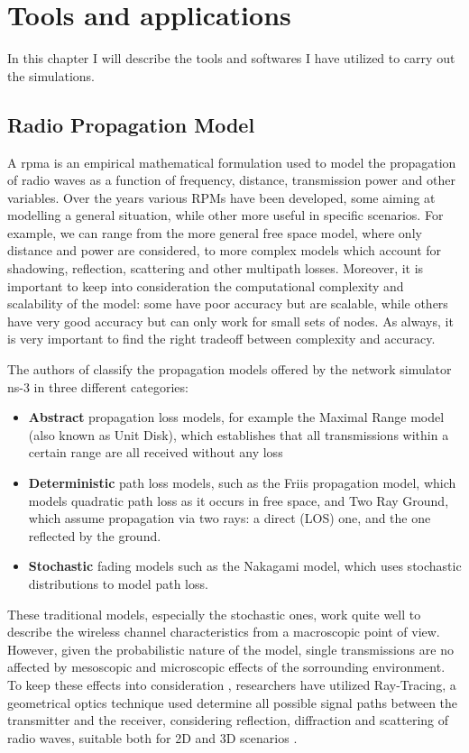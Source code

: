 
\chapter{Tools and applications}
	In this chapter I will describe the tools and softwares I have utilized to carry out the simulations.
	
	\section{Radio Propagation Model}
		A \gls{rpma} is an empirical mathematical formulation used to model the propagation of radio waves as a function of frequency, distance, transmission power and other variables. Over the years various RPMs have been developed, some aiming at modelling a general situation, while other more useful in specific scenarios. For example, we can range from the more general free space model, where only distance and power are considered, to more complex models which account for shadowing, reflection, scattering and other multipath losses. Moreover, it is important to keep into consideration the computational complexity and scalability of the model: some have poor accuracy but are scalable, while others have very good accuracy but can only work for small sets of nodes. As always, it is very important to find the right tradeoff between complexity and accuracy.
		
		
		The authors of \cite{6298165} classify the propagation models offered by the network simulator ns-3 in three different categories:
		\begin{itemize}
			\item \textbf{Abstract} propagation loss models, for example the Maximal Range model (also known as Unit Disk), which establishes that all transmissions within a certain range are all received without any loss
			\item \textbf{Deterministic} path loss models, such as the Friis propagation model, which models quadratic path loss as it occurs in free space, and Two Ray Ground, which assume propagation via two rays: a direct (LOS) one, and the one reflected by the ground.
			\item \textbf{Stochastic} fading models such as the Nakagami model, which uses stochastic distributions to model path loss.
		\end{itemize}
	
	
		These traditional models, especially the stochastic ones, work quite well to describe the wireless channel characteristics from a macroscopic point of view. However, given the probabilistic nature of the model, single transmissions are no affected by mesoscopic and microscopic effects of the sorrounding environment. To keep these effects into consideration , researchers have utilized Ray-Tracing, a geometrical optics technique used determine all possible signal paths between the transmitter and the receiver, considering reflection, diffraction and scattering of radio waves, suitable both for 2D and 3D scenarios \cite{245274} \cite{765022}.
		

